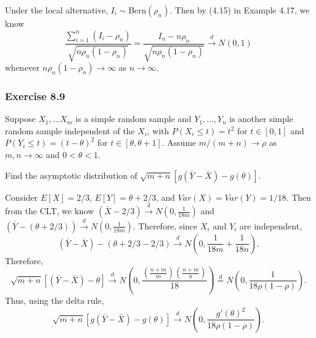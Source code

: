 \documentclass[12pt,]{article}
\begin{document}
Under the local alternative, \(I_i\sim\)Bern\((\rho_n).\) Then by (4.15)
in Example 4.17, we know
\[\frac{\sum_{i=1}^n(I_i-\rho_n)}{\sqrt{n\rho_n(1-\rho_n)}}=\frac{I_n-n\rho_n}{\sqrt{n\rho_n(1-\rho_n)}}\overset{d}\rightarrow N(0,1)\]
whenever \(n\rho_n(1-\rho_n)\rightarrow \infty\) as
\(n\rightarrow \infty.\)

\hypertarget{exercise-8.9}{%
\subsubsection{Exercise 8.9}\label{exercise-8.9}}

Suppose \(X_1,...X_m\) is a simple random sample and \(Y_1,...,Y_n\) is
another simple random sample independent of the \(X_i\), with
\(P(X_i\le t)=t^2\) for \(t\in [0,1]\) and \(P(Y_i\le t)=(t-\theta)^2\)
for \(t\in [\theta, \theta+1]\). Assume \(m/(m+n)\rightarrow \rho\) as
\(m,n\rightarrow \infty\) and \(0<\theta<1.\)

Find the asymptotic distribution of
\(\sqrt{m+n}[g(\bar Y-\bar X)-g(\theta)].\)

Consider \(E[X]=2/3\), \(E[Y]=\theta+2/3\), and \(Var(X)=Var(Y)=1/18.\)
Then from the CLT, we know
\((\bar X - 2/3)\overset{d}\rightarrow N\left(0,\frac{1}{18m}\right)\)
and
\(\left(\bar Y - (\theta+2/3)\right)\overset{d}\rightarrow N\left(0,\frac{1}{18m}\right)\).
Therefore, since \(X_i\) and \(Y_i\) are independent,
\[(\bar Y - \bar X) - (\theta+2/3-2/3)\overset{d}\rightarrow N\left(0, \frac{1}{18m}+\frac{1}{18n}\right).\]
Therefore,
\[\sqrt{m+n}\left[(\bar Y - \bar X) - \theta \right]\overset{d}\rightarrow N\left(0, \frac{\left(\frac{n+m}{m}\right)\left(\frac{n+m}{n}\right)}{18}\right)\overset{d}=N\left(0,\frac{1}{18\rho(1-\rho)}\right).\]
Thus, using the delta rule,
\[\sqrt{m+n}\left[g(\bar Y - \bar X) - g(\theta) \right]\overset{d}\rightarrow N\left(0,\frac{g'(\theta)^2}{18\rho(1-\rho)}\right).\]
\end{document}
